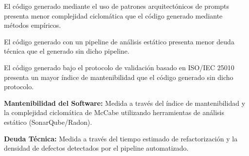 

\begin{listaHE}
    \item El código generado mediante el uso de patrones arquitectónicos de prompts presenta menor complejidad ciclomática que el código generado mediante métodos empíricos.
    \item El código generado con un pipeline de análisis estático presenta menor deuda técnica que el generado sin dicho pipeline.
    \item El código generado bajo el protocolo de validación basado en ISO/IEC 25010 presenta un mayor índice de mantenibilidad que el código generado sin dicho protocolo.
\end{listaHE}



\begin{listaVD}
    \item \textbf{Mantenibilidad del Software:} Medida a través del índice de mantenibilidad y la complejidad ciclomática de McCabe utilizando herramientas de análisis estático (SonarQube/Radon).
    \item \textbf{Deuda Técnica:} Medida a través del tiempo estimado de refactorización y la densidad de defectos detectados por el pipeline automatizado.
\end{listaVD}


